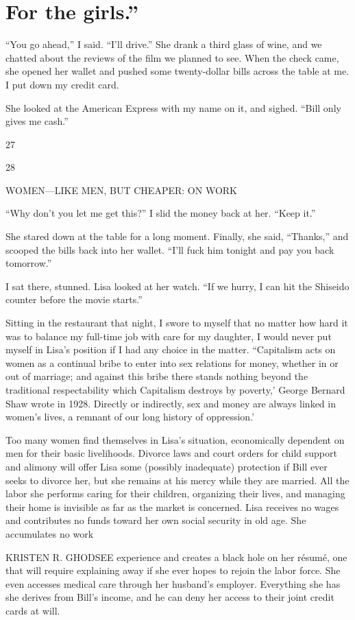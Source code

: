 \section{For the girls.”}
 \par 
“You go ahead,” I said. “I'll drive.” She drank a third glass of wine, and we chatted about the reviews of the film we planned to see. When the check came, she opened her wallet and pushed some twenty-dollar bills across the table at me. I put down my credit card.
 \par 
She looked at the American Express with my name on it, and sighed. “Bill only gives me cash.”
 \par 
27
 \par 
28
 \par 
WOMEN—LIKE MEN, BUT CHEAPER: ON WORK
 \par 
“Why don’t you let me get this?” I slid the money back at her. “Keep it.”
 \par 
She stared down at the table for a long moment. Finally, she said, “Thanks,” and scooped the bills back into her wallet. “I'll fuck him tonight and pay you back tomorrow.”
 \par 
I sat there, stunned. Lisa looked at her watch. “If we hurry, I can hit the Shiseido counter before the movie starts.”
 \par 
Sitting in the restaurant that night, I swore to myself that no matter how hard it was to balance my full-time job with care for my daughter, I would never put myself in Lisa’s position if I had any choice in the matter. “Capitalism acts on women as a continual bribe to enter into sex relations for money, whether in or out of marriage; and against this bribe there stands nothing beyond the traditional respectability which Capitalism destroys by poverty,’ George Bernard Shaw wrote in 1928. Directly or indirectly, sex and money are always linked in women’s lives, a remnant of our long history of oppression.’
 \par 
Too many women find themselves in Lisa’s situation, economically dependent on men for their basic livelihoods. Divorce laws and court orders for child support and alimony will offer Lisa some (possibly inadequate) protection if Bill ever seeks to divorce her, but she remains at his mercy while they are married. All the labor she performs caring for their children, organizing their lives, and managing their home is invisible as far as the market is concerned. Lisa receives no wages and contributes no funds toward her own social security in old age. She accumulates no work
 \par 
KRISTEN R. GHODSEE experience and creates a black hole on her résumé, one that will require explaining away if she ever hopes to rejoin the labor force. She even accesses medical care through her husband’s employer. Everything she has she derives from Bill’s income, and he can deny her access to their joint credit cards at will.
 \par 

